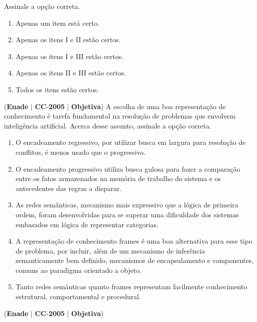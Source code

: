\documentclass{exam}
\begin{document}
\begin{questions}
Assinale a opção correta.
	\begin{enumerate}[label=\alph*)]
		\item  Apenas um item está certo.
		\item  Apenas os itens I e II estão certos.
		\item  Apenas os itens I e III estão certos.
		\item  Apenas os itens II e III estão certos.
		\item  Todos os itens estão certos.
	\end{enumerate}

\question (\textbf{Enade} $|$ \textbf{CC}-\textbf{2005} $|$ \textbf{Objetiva})
A escolha de uma boa representação de conhecimento é tarefa
fundamental na resolução de problemas que envolvem
inteligência artificial. Acerca desse assunto, assinale a opção
correta.
	\begin{enumerate}[label=\alph*)]
		\item  O encadeamento regressivo, por utilizar busca em largura
para resolução de conflitos, é menos usado que o progressivo.
		\item  O encadeamento progressivo utiliza busca gulosa para fazer
a comparação entre os fatos armazenados na memória de
trabalho do sistema e os antecedentes das regras a disparar.
		\item  As redes semânticas, mecanismo mais expressivo que a
lógica de primeira ordem, foram desenvolvidas para se
superar uma dificuldade dos sistemas embasados em lógica
de representar categorias.
		\item  A representação de conhecimento frames é uma boa
alternativa para esse tipo de problema, por incluir, além de
um mecanismo de inferência semanticamente bem definido,
mecanismos de encapsulamento e componentes, comuns ao
paradigma orientado a objeto.
		\item  Tanto redes semânticas quanto frames representam
facilmente conhecimento estrutural, comportamental e
procedural.
	\end{enumerate}

\question (\textbf{Enade} $|$ \textbf{CC}-\textbf{2005} $|$ \textbf{Objetiva})


\end{questions}
\end{document}
